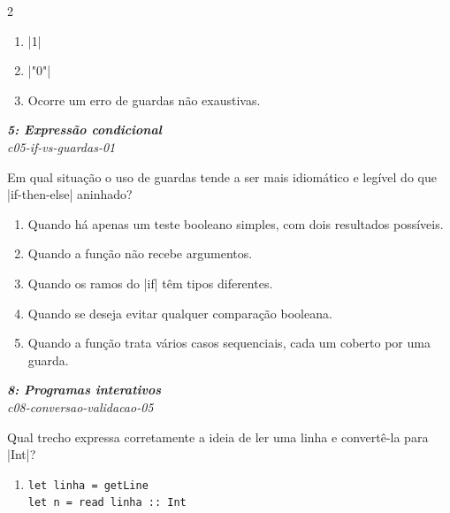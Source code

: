 \documentclass[a4paper,10pt,brazil]{article}
\begin{document}
\begin{multicols}{2}
\begin{enumerate}
  \item \haskellinline|1|

  \item \haskellinline|"0"|

  \item Ocorre um erro de guardas não exaustivas.


\end{enumerate}

\begin{flushright}
  \footnotesize
  \textit{\textbf{5: Expressão condicional}}\\
  \textit{c05-if-vs-guardas-01}\\

\end{flushright}
Em qual situação o uso de guardas tende a ser mais idiomático e legível do que \haskellinline|if-then-else| aninhado?

\begin{enumerate}
  \item Quando há apenas um teste booleano simples, com dois resultados possíveis.

  \item Quando a função não recebe argumentos.

  \item Quando os ramos do \haskellinline|if| têm tipos diferentes.

  \item Quando se deseja evitar qualquer comparação booleana.

  \item Quando a função trata vários casos sequenciais, cada um coberto por uma guarda.


\end{enumerate}

\begin{flushright}
  \footnotesize
  \textit{\textbf{8: Programas interativos}}\\
  \textit{c08-conversao-validacao-05}\\

\end{flushright}
Qual trecho expressa corretamente a ideia de ler uma linha e convertê-la para \haskellinline|Int|?

\begin{enumerate}
  \item \begin{verbatim}
let linha = getLine
let n = read linha :: Int
\end{verbatim}


\end{enumerate}
\end{multicols}
\end{document}
